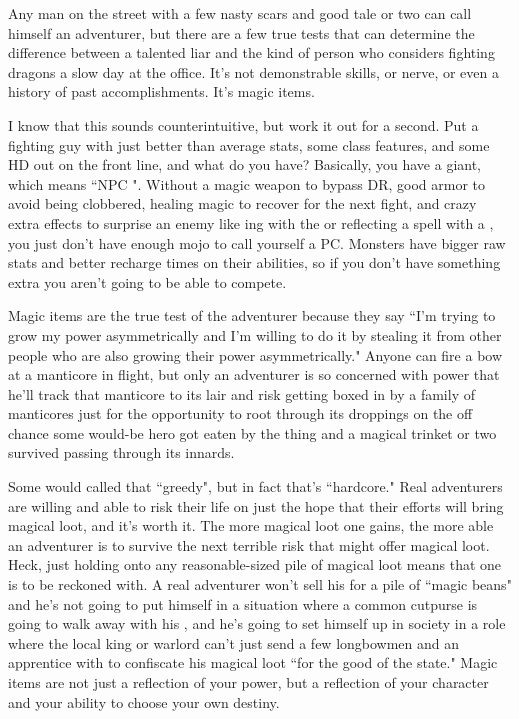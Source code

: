 Any man on the street with a few nasty scars and good tale or two can call himself an adventurer, but there are a few true tests that can determine the difference between a talented liar and the kind of person who considers fighting dragons a slow day at the office. It's not demonstrable skills, or nerve, or even a history of past accomplishments. It's magic items.

I know that this sounds counterintuitive, but work it out for a second. Put a fighting guy with just better than average stats, some class features, and some HD out on the front line, and what do you have? Basically, you have a giant, which means ``NPC ". Without a magic weapon to bypass DR, good armor to avoid being clobbered, healing magic to recover for the next fight, and crazy extra effects to surprise an enemy like ing with the  or reflecting a spell with a , you just don't have enough mojo to call yourself a PC. Monsters have bigger raw stats and better recharge times on their abilities, so if you don't have something extra you aren't going to be able to compete.

Magic items are the true test of the adventurer because they say ``I'm trying to grow my power asymmetrically and I'm willing to do it by stealing it from other people who are also growing their power asymmetrically." Anyone can fire a bow at a manticore in flight, but only an adventurer is so concerned with power that he'll track that manticore to its lair and risk getting boxed in by a family of manticores just for the opportunity to root through its droppings on the off chance some would-be hero got eaten by the thing and a magical trinket or two survived passing through its innards.

Some would called that ``greedy", but in fact that's ``hardcore." Real adventurers are willing and able to risk their life on just the hope that their efforts will bring magical loot, and it's worth it. The more magical loot one gains, the more able an adventurer is to survive the next terrible risk that might offer magical loot. Heck, just holding onto any reasonable-sized pile of magical loot means that one is to be reckoned with. A real adventurer won't sell his  for a pile of ``magic beans" and he's not going to put himself in a situation where a common cutpurse is going to walk away with his , and he's going to set himself up in society in a role where the local king or warlord can't just send a few longbowmen and an apprentice with  to confiscate his magical loot ``for the good of the state." Magic items are not just a reflection of your power, but a reflection of your character and your ability to choose your own destiny.

